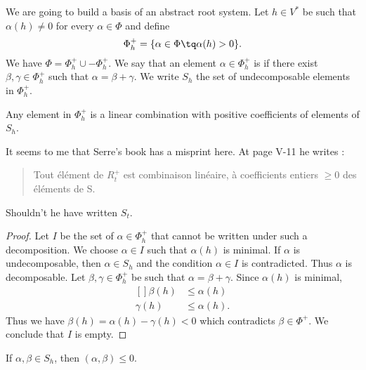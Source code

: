 We are going to build a basis of an abstract root system. Let \( h\in V^*\) be such that \( \alpha(h)\neq 0\) for every  \( \alpha\in\Phi\) and define
\begin{equation}
    \Phi_h^+=\{ \alpha\in\Phi\tq \alpha(h)>0 \}.
\end{equation}
We have \( \Phi=\Phi^+_h\cup -\Phi_h^+\). We say that an element \( \alpha\in\Phi^+_h\) is  if there exist \( \beta,\gamma\in\Phi_h^+\) such that \( \alpha=\beta+\gamma\). We write \( S_h\) the set of undecomposable elements in \( \Phi^+_h\).

\begin{lemma}       \label{LemShPhihpCBLSh}
    Any element in \( \Phi^+_h\) is a linear combination with positive coefficients of elements of \( S_h\).
\end{lemma}

\begin{probleme}
    It seems to me that Serre's book\cite{SerreSSAlgebres} has a misprint here. At page V-11 he writes :
    \begin{quote}
        Tout élément de \( R^+_t\) est combinaison linéaire, à coefficients entiers \( \geq 0\) des éléments de S.
    \end{quote}
    Shouldn't he have written \( S_t\).
\end{probleme}

\begin{proof}
    Let \( I\) be the set of \( \alpha\in\Phi^+_h\) that cannot be written under such a decomposition. We choose \( \alpha\in I\) such that \( \alpha(h)\) is minimal. If \( \alpha\) is undecomposable, then \( \alpha\in S_h\) and the condition \( \alpha\in I\) is contradicted. Thus \( \alpha\) is decomposable. Let \( \beta,\gamma\in\Phi^+_h\) be such that \( \alpha=\beta+\gamma\). Since \( \alpha(h)\) is minimal,
    \begin{equation}
        \begin{aligned}[]
            \beta(h)&\leq \alpha(h)\\
            \gamma(h)&\leq \alpha(h).
        \end{aligned}
    \end{equation}
    Thus we have \( \beta(h)=\alpha(h)-\gamma(h)<0\) which contradicts \( \beta\in\Phi^+\). We conclude that \( I\) is empty.
\end{proof}

\begin{lemma}       \label{LemShabShablesz}
    If \( \alpha,\beta\in S_h\), then \( (\alpha,\beta)\leq 0\).
\end{lemma}

